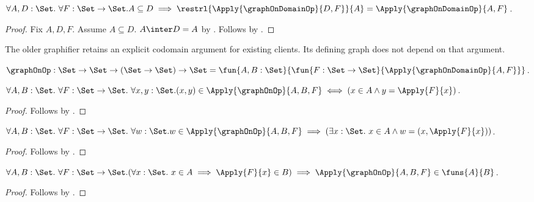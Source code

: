 \begin{proposition}\label{logical_graph_on_domain_restrl_of_subset}
    $\forall A,D:\Set.\ \forall F:\Set\to\Set.
        A\subseteq D
        \implies
        \restrl{\Apply{\graphOnDomainOp}{D,F}}{A}
            =\Apply{\graphOnDomainOp}{A,F}$.
\end{proposition}
\begin{proof}
    Fix $A,D,F$.
    Assume $A\subseteq D$.
    $A\inter D=A$ by .
    Follows by .
\end{proof}

The older graphifier retains an explicit codomain argument for existing
clients.  Its defining graph does not depend on that argument.

\begin{definition}\label{logical_graph_on}
    $\graphOnOp:\Set\to\Set\to(\Set\to\Set)\to\Set
        =\fun{A,B:\Set}{
                \fun{F:\Set\to\Set}{
                    \Apply{\graphOnDomainOp}{A,F}}}$.
\end{definition}

\begin{proposition}\label{logical_graph_on_membership}
    $\forall A,B:\Set.\ \forall F:\Set\to\Set.\ \forall x,y:\Set.
        (x,y)\in
            \Apply{\graphOnOp}{A,B,F}
        \iff (x\in A\land y=\Apply{F}{x})$.
\end{proposition}
\begin{proof}
    Follows by
        .
\end{proof}

\begin{proposition}\label{logical_graph_on_elim}
    $\forall A,B:\Set.\ \forall F:\Set\to\Set.\ \forall w:\Set.
        w\in\Apply{\graphOnOp}{A,B,F}
        \implies
        (\exists x:\Set.\ x\in A\land w=(x,\Apply{F}{x}))$.
\end{proposition}
\begin{proof}
    Follows by .
\end{proof}

\begin{theorem}\label{logical_graph_on_function}
    $\forall A,B:\Set.\ \forall F:\Set\to\Set.
        (\forall x:\Set.\ x\in A\implies\Apply{F}{x}\in B)
        \implies
        \Apply{\graphOnOp}{A,B,F}
            \in\funs{A}{B}$.
\end{theorem}
\begin{proof}
    Follows by .
\end{proof}

